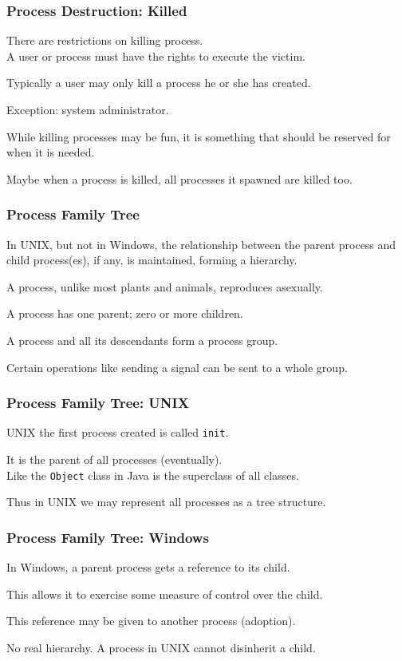 \begin{frame}
	\frametitle{Process Destruction: Killed}

	There are restrictions on killing process.\\
	\quad A user or process must have the rights to execute the victim.

	Typically a user may only kill a process he or she has created.

	Exception: system administrator.

	While killing processes may be fun, it is something that should be reserved for when it is needed.

	Maybe when a process is killed, all processes it spawned are killed too.


\end{frame}


\begin{frame}
	\frametitle{Process Family Tree}
	In UNIX, but not in Windows, the relationship between the parent process and child process(es), if any, is maintained, forming a hierarchy.

	A process, unlike most plants and animals, reproduces asexually.

	A process has one parent; zero or more children.

	A process and all its descendants form a \alert{process group}.

	Certain operations like sending a signal can be sent to a whole group.

\end{frame}

\begin{frame}
	\frametitle{Process Family Tree: UNIX}
	UNIX the first process created is called \texttt{init}.

	It is the parent of all processes (eventually).\\
	\quad Like the \texttt{Object} class in Java is the superclass of all classes.

	Thus in UNIX we may represent all processes as a tree structure.

\end{frame}

\begin{frame}
	\frametitle{Process Family Tree: Windows}

	In Windows, a parent process gets a reference to its child.

	This allows it to exercise some measure of control over the child.

	This reference may be given to another process (adoption).

	No real hierarchy. A process in UNIX cannot disinherit a child.


\end{frame}

